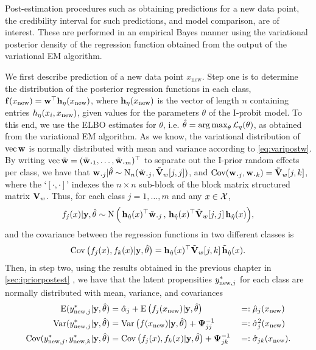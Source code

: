 Post-estimation procedures such as obtaining predictions for a new data point, the credibility interval for such predictions, and model comparison, are of interest.
These are performed in an empirical Bayes manner using the variational posterior density of the regression function obtained from the output of the variational EM algorithm.

We first describe prediction of a new data point $x_{\text{new}}$.
Step one is to determine the distribution of the posterior regression functions in each class, ${\mathbf f}(x_{\text{new}}) = {\mathbf w}^\top{\mathbf h}_\eta(x_{\text{new}})$, where ${\mathbf h}_\eta(x_{\text{new}})$ is the vector of length $n$ containing entries $h_\eta(x_i,x_{\text{new}})$, given values for the parameters $\theta$ of the I-probit model.
To this end, we use the ELBO estimates for $\theta$, i.e. $\hat\theta = \operatorname*{arg\,max}_\theta {\mathcal L}_q(\theta)$, as obtained from the variational EM algorithm.
As we know, the variational distribution of $\operatorname{vec}{\mathbf w}$ is normally distributed with mean and variance according to \cref{eq:varipostw}.
By writing $\vecc \tilde\bw = (\tilde \bw_{\bigcdot 1}, \dots, \tilde \bw_{\bigcdot m})^\top$ to separate out the I-prior random effects per class, we have that $\bw_{\bigcdot j}|\hat\theta \sim \N_n(\tilde \bw_{\bigcdot j}, \tilde\bV_w[j,j])$, and $\Cov(\bw_{\bigcdot j},\bw_{\bigcdot k}) = \tilde\bV_w[j,k]$, where the `$[\cdot,\cdot]$' indexes the $n\times n$ sub-block of the block matrix structured matrix ${\mathbf V}_w$.
Thus, for each class $j=1,\dots,m$ and any $x \in {\mathcal X}$,
\[
  f_j(x)|\by,\hat\theta \sim \N\Big(\,
  \bh_{\hat\eta}(x)^\top \tilde\bw_{\bigcdot j} \, , \,
  \bh_{\hat\eta}(x)^\top\tilde\bV_w[j,j] \, \bh_{\hat\eta}(x)
  \Big),
\]
and the covariance between the regression functions in two different classes is
\[
  \operatorname{Cov}\big(f_j(x),f_k(x)|{\mathbf y},\hat\theta \big) = 
  {\mathbf h}_{\hat\eta}(x)^\top \tilde{{\mathbf V}}_w[j,k] \, \tilde{{\mathbf h}}_{\hat\eta}(x).
\]
Then, in step two, using the results obtained in the previous chapter in \cref{sec:ipriorpostest} , we have that the latent propensities $y_{{\text{new}},j}^*$ for each class are normally distributed with mean, variance, and covariances
\begin{alignat*}{3}
  \operatorname{E}(y_{{\text{new}},j}^*|{\mathbf y},\hat\theta) 
  &= \hat\alpha_j + \operatorname{E} \big( f_j(x_{\text{new}}) |{\mathbf y},\hat\theta \big)
  &&=: \hat\mu_j(x_\text{new}) \\
  \operatorname{Var}(y_{{\text{new}},j}^*|{\mathbf y},\hat\theta) 
  &= \operatorname{Var}\big(f(x_{\text{new}})|{\mathbf y},\hat\theta \big) + {\bm\Psi}^{-1}_{jj}
  &&=: \hat\sigma_j^2(x_\text{new}) \\
  \operatorname{Cov}(y_{{\text{new}},j}^*,y_{{\text{new}},k}^*|{\mathbf y},\hat\theta)
  &= \operatorname{Cov}\big(f_j(x),f_k(x)|{\mathbf y},\hat\theta \big) + {\bm\Psi}^{-1}_{jk}
  &&=: \hat\sigma_{jk}(x_\text{new}).
\end{alignat*}

